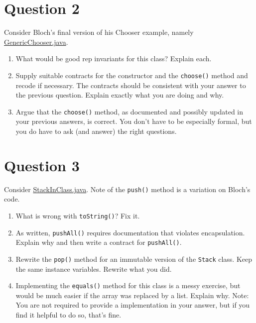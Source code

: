 \documentclass[10pt]{article}
\begin{document}
\section{Question 2}

Consider Bloch's final version of his Chooser example, namely  \href{https://nguyenthanhvuh.github.io/class-oo/files/GenericChooser.java}{GenericChooser.java}.


\begin{enumerate}
\item
What would be good rep invariants for this class?  Explain each. %
\item
Supply suitable contracts for the constructor and the {\tt choose()} method
and recode if necessary.
The contracts should be consistent with your answer to the previous question.
Explain exactly what you are doing and why.
\item
Argue that the {\tt choose()} method, as documented and possibly updated
in your previous answers, is correct.  
You don't have to be especially formal, but you do have
to ask (and answer) the right questions.  
\end{enumerate}

\newpage
\section{Question 3}

Consider \href{https://nguyenthanhvuh.github.io/class-oo/files/StackInClass.java}{StackInClass.java}.
Note of the {\tt push()} method is a variation on Bloch's code.

\begin{enumerate}
\item
What is wrong with {\tt toString()}?  Fix it.

\item
As written, {\tt pushAll()} requires documentation that violates encapsulation.  Explain why
and then write a contract for {\tt pushAll()}.

\item
Rewrite the {\tt pop()} method for an immutable version of the {\tt Stack} class.
Keep the same instance variables. Rewrite what you did.

\item
Implementing the {\tt equals()} method for this class is a messy exercise, but would
	be much easier if the array was replaced by a list.  Explain why.
	Note:  You are not required to provide a implementation in your answer,
	but if you find it helpful to do so, that's fine.
\end{enumerate}
\end{document}
